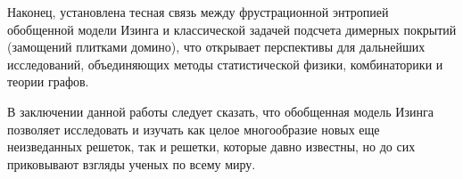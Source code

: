 \documentclass[utf8,12pt]{jetp}
\begin{document}
Наконец, установлена тесная связь между фрустрационной энтропией обобщенной модели Изинга и классической задачей подсчета димерных покрытий (замощений плитками домино), что открывает перспективы для дальнейших исследований, объединяющих методы статистической физики, комбинаторики и теории графов. 

В заключении данной работы следует сказать, что обобщенная модель Изинга позволяет исследовать и изучать как целое многообразие новых еще неизведанных решеток, так и решетки, которые давно известны, но до сих приковывают взгляды ученых по всему миру.
		
	
	
\end{document}

